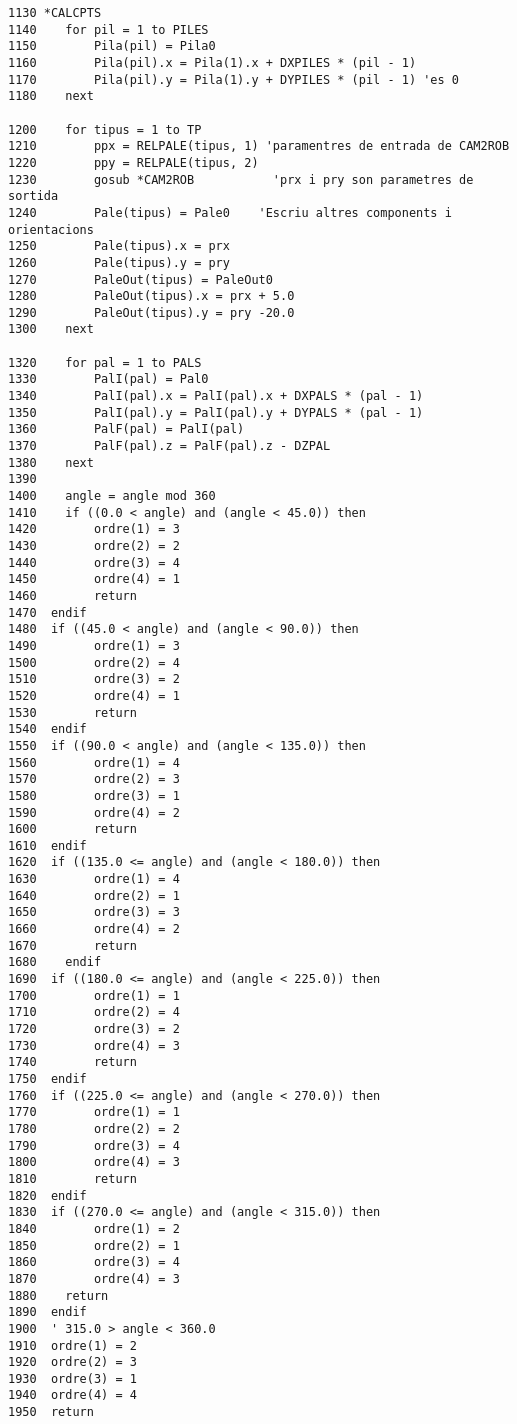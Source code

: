\label{casosrot}
\begin{verbatim}
1130 *CALCPTS
1140    for pil = 1 to PILES
1150        Pila(pil) = Pila0
1160        Pila(pil).x = Pila(1).x + DXPILES * (pil - 1)
1170        Pila(pil).y = Pila(1).y + DYPILES * (pil - 1) 'es 0
1180    next

1200    for tipus = 1 to TP
1210        ppx = RELPALE(tipus, 1) 'paramentres de entrada de CAM2ROB
1220        ppy = RELPALE(tipus, 2)
1230        gosub *CAM2ROB           'prx i pry son parametres de sortida
1240        Pale(tipus) = Pale0    'Escriu altres components i orientacions
1250        Pale(tipus).x = prx
1260        Pale(tipus).y = pry
1270        PaleOut(tipus) = PaleOut0
1280        PaleOut(tipus).x = prx + 5.0
1290        PaleOut(tipus).y = pry -20.0
1300    next

1320    for pal = 1 to PALS
1330        PalI(pal) = Pal0
1340        PalI(pal).x = PalI(pal).x + DXPALS * (pal - 1)
1350        PalI(pal).y = PalI(pal).y + DYPALS * (pal - 1)
1360        PalF(pal) = PalI(pal)
1370        PalF(pal).z = PalF(pal).z - DZPAL
1380    next
1390 	
1400    angle = angle mod 360
1410 	if ((0.0 < angle) and (angle < 45.0)) then
1420        ordre(1) = 3
1430        ordre(2) = 2
1440        ordre(3) = 4
1450        ordre(4) = 1
1460        return
1470  endif
1480  if ((45.0 < angle) and (angle < 90.0)) then 
1490        ordre(1) = 3
1500        ordre(2) = 4
1510        ordre(3) = 2
1520        ordre(4) = 1
1530        return
1540  endif
1550  if ((90.0 < angle) and (angle < 135.0)) then
1560        ordre(1) = 4
1570        ordre(2) = 3
1580        ordre(3) = 1
1590        ordre(4) = 2
1600        return
1610  endif
1620  if ((135.0 <= angle) and (angle < 180.0)) then
1630        ordre(1) = 4
1640        ordre(2) = 1
1650        ordre(3) = 3
1660        ordre(4) = 2
1670 		return
1680 	endif
1690  if ((180.0 <= angle) and (angle < 225.0)) then 
1700        ordre(1) = 1
1710        ordre(2) = 4
1720        ordre(3) = 2
1730        ordre(4) = 3
1740        return
1750  endif
1760  if ((225.0 <= angle) and (angle < 270.0)) then
1770        ordre(1) = 1
1780        ordre(2) = 2
1790        ordre(3) = 4
1800        ordre(4) = 3
1810        return
1820  endif
1830  if ((270.0 <= angle) and (angle < 315.0)) then 
1840        ordre(1) = 2
1850        ordre(2) = 1
1860        ordre(3) = 4
1870        ordre(4) = 3
1880 	return
1890  endif
1900  ' 315.0 > angle < 360.0
1910  ordre(1) = 2
1920  ordre(2) = 3
1930  ordre(3) = 1
1940  ordre(4) = 4
1950  return
\end{verbatim}

